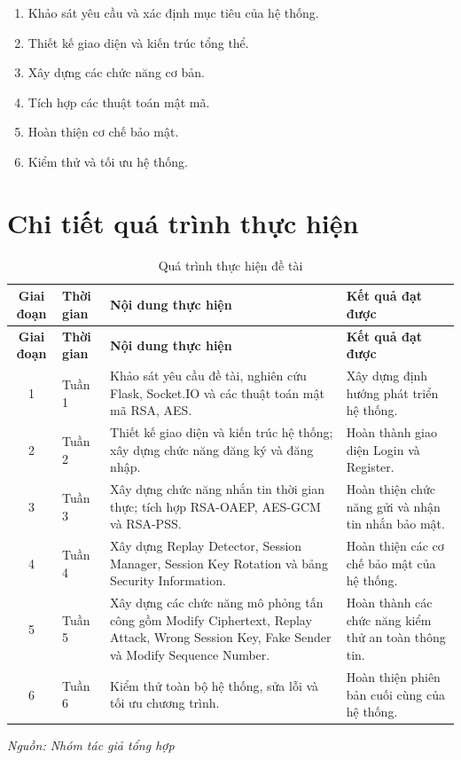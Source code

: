 \begin{enumerate}
\item Khảo sát yêu cầu và xác định mục tiêu của hệ thống.
\item Thiết kế giao diện và kiến trúc tổng thể.
\item Xây dựng các chức năng cơ bản.
\item Tích hợp các thuật toán mật mã.
\item Hoàn thiện cơ chế bảo mật.
\item Kiểm thử và tối ưu hệ thống.
\end{enumerate}

\section{Chi tiết quá trình thực hiện}

\begin{longtable}{|c|p{3cm}|p{6cm}|p{4cm}|}
\caption{Quá trình thực hiện đề tài}
\label{tab:qua-trinh-thuc-hien}\\

\hline
\textbf{Giai đoạn} &
\textbf{Thời gian} &
\textbf{Nội dung thực hiện} &
\textbf{Kết quả đạt được}\\
\hline
\endfirsthead

\hline
\textbf{Giai đoạn} &
\textbf{Thời gian} &
\textbf{Nội dung thực hiện} &
\textbf{Kết quả đạt được}\\
\hline
\endhead

1 &
Tuần 1 &
Khảo sát yêu cầu đề tài, nghiên cứu Flask, Socket.IO và các thuật toán mật mã RSA, AES.
&
Xây dựng định hướng phát triển hệ thống.
\\
\hline

2 &
Tuần 2 &
Thiết kế giao diện và kiến trúc hệ thống; xây dựng chức năng đăng ký và đăng nhập.
&
Hoàn thành giao diện Login và Register.
\\
\hline

3 &
Tuần 3 &
Xây dựng chức năng nhắn tin thời gian thực; tích hợp RSA-OAEP, AES-GCM và RSA-PSS.
&
Hoàn thiện chức năng gửi và nhận tin nhắn bảo mật.
\\
\hline

4 &
Tuần 4 &
Xây dựng Replay Detector, Session Manager, Session Key Rotation và bảng Security Information.
&
Hoàn thiện các cơ chế bảo mật của hệ thống.
\\
\hline

5 &
Tuần 5 &
Xây dựng các chức năng mô phỏng tấn công gồm Modify Ciphertext, Replay Attack, Wrong Session Key, Fake Sender và Modify Sequence Number.
&
Hoàn thành các chức năng kiểm thử an toàn thông tin.
\\
\hline

6 &
Tuần 6 &
Kiểm thử toàn bộ hệ thống, sửa lỗi và tối ưu chương trình.
&
Hoàn thiện phiên bản cuối cùng của hệ thống.
\\
\hline

\end{longtable}

\begin{flushright}
\textit{Nguồn: Nhóm tác giả tổng hợp}
\end{flushright}